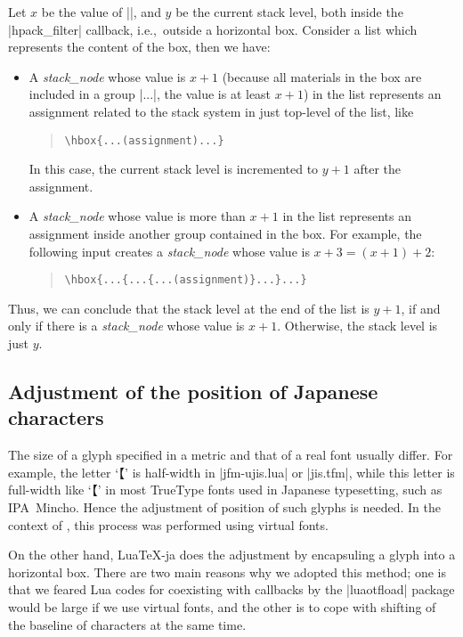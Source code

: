 \documentclass{ajt}
\begin{document}
Let $x$ be the value of |\currentgrouplevel|, and $y$ be the current
stack level, both inside the |hpack_filter| callback, i.e.,~outside a
horizontal box. Consider a list which represents the content of the box,
then we have:
\begin{itemize}
\item A \emph{stack\_node} whose value is $x+1$ (because all materials in
      the box are included in a group |\hbox{...}|, the value is at
      least $x+1$) in the list represents an assignment related to the
      stack system in just top-level of the list, like
\begin{quote}
\begin{verbatim}
\hbox{...(assignment)...}
\end{verbatim}
\end{quote}
In this case, the current stack level is incremented to $y+1$ after the assignment.
\item A \emph{stack\_node} whose value is more than  $x+1$ in the list represents
an assignment inside another group contained in the box. For example,
      the following input creates
a \emph{stack\_node} whose value is $x+3=(x+1)+2$:
\begin{quote}
\begin{verbatim}
\hbox{...{...{...(assignment)}...}...}
\end{verbatim}
\end{quote}
\end{itemize}
Thus, we can conclude that the stack level at the end of the list is
$y+1$, if and only if there is a \emph{stack\_node} whose value is
$x+1$. Otherwise, the stack level is just $y$.

\subsection{Adjustment of the position of Japanese characters}
\label{ssec-width}

The size of a glyph specified in a metric and that of a real font
usually differ. For example, the letter `\inhibitglue【' is half-width
in |jfm-ujis.lua| or |jis.tfm|, while this letter is full-width like `【'
in most TrueType fonts used in Japanese typesetting, such as
IPA~Mincho. Hence the adjustment of position of such glyphs is
needed. In the context of \pTeX, this process was performed using virtual fonts.

On the other hand, Lua\TeX-ja does the adjustment by encapsuling a glyph
into a horizontal box. There are two main reasons why we adopted this
method; one is that we feared Lua codes for coexisting with callbacks by
the |luaotfload| package would be large if we use virtual fonts, and the
other is to cope with shifting of the baseline of characters at the
same time. 
\end{document}
